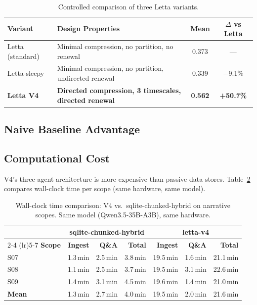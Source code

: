 \documentclass[11pt,letterpaper]{article}
\begin{document}
\begin{table}[H]
\centering
\small
\caption{Controlled comparison of three Letta variants.}
\label{tab:progression}
\begin{tabular}{llcc}
\toprule
\textbf{Variant} & \textbf{Design Properties} & \textbf{Mean} & \textbf{$\Delta$ vs Letta} \\
\midrule
Letta (standard) & Minimal compression, no partition, no renewal & 0.373 & --- \\
Letta-sleepy & Minimal compression, no partition, undirected renewal & 0.339 & $-$9.1\% \\
\rowcolor{lightgreen}
\textbf{Letta V4} & \textbf{Directed compression, 3 timescales, directed renewal} & \textbf{0.562} & \textbf{+50.7\%} \\
\bottomrule
\end{tabular}
\end{table}

\subsection{Naive Baseline Advantage}

\subsection{Computational Cost}

V4's three-agent architecture is more expensive than passive data stores. Table~\ref{tab:cost} compares wall-clock time per scope (same hardware, same model).

\begin{table}[H]
\centering
\small
\caption{Wall-clock time comparison: V4 vs.\ sqlite-chunked-hybrid on narrative scopes. Same model (Qwen3.5-35B-A3B), same hardware.}
\label{tab:cost}
\begin{tabular}{lrrrrrr}
\toprule
 & \multicolumn{3}{c}{\textbf{sqlite-chunked-hybrid}} & \multicolumn{3}{c}{\textbf{letta-v4}} \\
\cmidrule(lr){2-4} \cmidrule(lr){5-7}
\textbf{Scope} & \textbf{Ingest} & \textbf{Q\&A} & \textbf{Total} & \textbf{Ingest} & \textbf{Q\&A} & \textbf{Total} \\
\midrule
S07 & 1.3\,min & 2.5\,min & 3.8\,min & 19.5\,min & 1.6\,min & 21.1\,min \\
S08 & 1.1\,min & 2.5\,min & 3.7\,min & 19.5\,min & 3.1\,min & 22.6\,min \\
S09 & 1.4\,min & 3.1\,min & 4.5\,min & 19.6\,min & 1.4\,min & 21.0\,min \\
\midrule
\textbf{Mean} & 1.3\,min & 2.7\,min & 4.0\,min & 19.5\,min & 2.0\,min & 21.6\,min \\
\bottomrule
\end{tabular}
\end{table}
\end{document}
